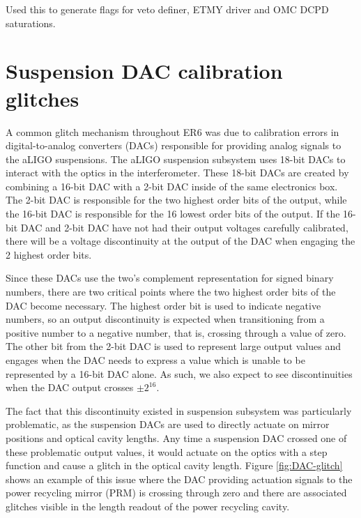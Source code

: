 Used this to generate flags for veto definer, ETMY driver and OMC DCPD saturations.

\section{Suspension DAC calibration glitches}

A common glitch mechanism throughout ER6 was due to calibration errors in 
digital-to-analog converters (DACs) responsible for providing analog signals 
to the aLIGO suspensions. The aLIGO suspension subsystem uses 18-bit DACs 
to interact with the optics in the interferometer. These 18-bit DACs are 
created by combining a 16-bit DAC with a 2-bit DAC inside of the same 
electronics box. The 2-bit DAC is responsible for the two highest order 
bits of the output, while the 16-bit DAC is responsible for the 16 lowest 
order bits of the output. If the 16-bit DAC and 2-bit DAC have not had 
their output voltages carefully calibrated, there will be a voltage discontinuity 
at the output of the DAC when engaging the 2 highest order bits. 

Since these DACs use the two's complement 
representation for signed binary numbers, there are two critical points 
where the two highest order bits of the DAC become necessary. The highest 
order bit is used to indicate negative numbers, so an output discontinuity 
is expected when transitioning from a positive number to a negative number, 
that is, crossing through a value of zero.  
The other bit from the 2-bit DAC is used to represent large output values and 
engages when the DAC needs to express a value which is unable to be 
represented by a 16-bit DAC alone. As such, we also 
expect to see discontinuities when the DAC output crosses $\pm2^{16}$. 

The fact that this discontinuity existed in suspension subsystem was 
particularly problematic, as the suspension DACs are used to directly 
actuate on mirror positions and optical cavity lengths. Any time a 
suspension DAC crossed one of these problematic output values, it would 
actuate on the optics with a step function and cause a glitch in the 
optical cavity length. Figure \ref{fig:DAC-glitch} shows an example of 
this issue where the DAC providing actuation signals to the power recycling 
mirror (PRM) is crossing through zero and there are associated glitches 
visible in the length readout of the power recycling cavity.

